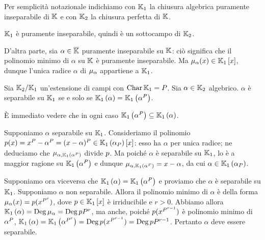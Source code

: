 \Proof Per semplicit\`a notazionale indichiamo con $\mathbb{K}_1$ la chiusura algebrica puramente inseparabile di $\mathbb{K}$ e con $\mathbb{K}_2$ la chiusura perfetta di $\mathbb{K}$.
\par $\mathbb{K}_1$ \`e puramente inseparabile, quindi \`e un sottocampo di $\mathbb{K}_2$.
\par D'altra parte, sia $\alpha \in \overline{\mathbb{K}}$ puramente inseparabile su $\mathbb{K}$: ci\`o significa che il polinomio minimo di $\alpha$ su $\mathbb{K}$ \`e puramente inseparabile. Ma $\MinimalPolynomial{\alpha}(x) \in \RingAdjunction{\Field_1}{x}$, dunque l'unica radice $\alpha$ di $\MinimalPolynomial{\alpha}$ appartiene a $\mathbb{K}_1$. \EndProof
\begin{Theorem}
	Sia $\mathbb{K}_2/\mathbb{K}_1$ un'estensione di campi con $\operatorname{Char}{\mathbb{K}_1} = P$. Sia $\alpha \in \mathbb{K}_2$ algebrico. $\alpha$ \`e separabile su $\mathbb{K}_1$ se e solo se $\mathbb{K}_1 \left ( \alpha \right ) = \mathbb{K}_1 \left ( \alpha^P \right )$.
\end{Theorem}
\Proof \`E immediato vedere che in ogni caso $\mathbb{K}_1 \left ( \alpha^P \right ) \subseteq \mathbb{K}_1 \left ( \alpha \right )$.
\par Supponiamo $\alpha$ separabile su $\mathbb{K}_1$. Consideriamo il polinomio $p(x) = x^P - \alpha^P = (x - \alpha)^P \in \mathbb{K}_1 \left ( \alpha_P \right ) \left [ x \right ]$: esso ha $\alpha$ per unica radice; ne deduciamo che $\MinimalPolynomial{\alpha}[\FieldAdjunction{\Field_1}{\alpha^\Prime}]$ divide $p$. Ma poich\'e $\alpha$ \`e separabile su $\mathbb{K}_1$, lo \`e a maggior ragione su $\mathbb{K}_1 \left ( \alpha^P \right )$ e dunque $\MinimalPolynomial{\alpha}[\FieldAdjunction{\Field_1}{\alpha^\Prime}] = x - \alpha$, da cui $\alpha \in \mathbb{K}_1 \left ( \alpha_P \right )$.
\par Supponiamo ora viceversa che $\mathbb{K}_1 \left ( \alpha \right ) = \mathbb{K}_1 \left ( \alpha^P \right )$ e proviamo che $\alpha$ \`e separabile su $\mathbb{K}_1$. Supponiamo $\alpha$ non separabile. Allora il polinomio minimo di $\alpha$ \`e della forma $\MinimalPolynomial{\alpha}(x) = \Polynomial(x^{\Prime^r})$, dove $p \in \mathbb{K}_1 \left [ x \right ]$ \`e irriducibile e $r > 0$. Abbiamo allora $\FieldAdjunction{\Field_1}{\alpha} = \PolynomialDegree{\MinimalPolynomial{\alpha}} = \PolynomialDegree{\Polynomial} \Prime^r$, ma anche, poich\'e $p(x^{P^{r - 1}})$ \`e polinomio minimo di $\alpha^P$, $\mathbb{K}_1 \left ( \alpha \right ) = \mathbb{K}_1 \left ( \alpha^{P^r} \right ) = \operatorname{\operatorname{Deg}}{p(x^{P^{r - 1}})} = \operatorname{\operatorname{Deg}}{p} P^{r - 1}$. Pertanto $\alpha$ deve essere separabile. \EndProof
